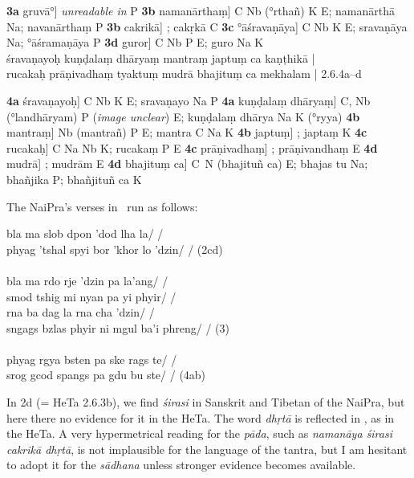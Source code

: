 \documentclass[naipra.tex]{subfiles}
\begin{document}
\begin{sanskrit}
{\begin{english}
\begin{prosequote}
			\noindent \textbf{3a} gruvā°] \emph{unreadable in} P
			\textbf{3b} namanārthaṃ] C Nb (°rthañ) K E; namanārthā Na; navanārthaṃ P
			\textbf{3b} cakrikā] ; cakṛkā C
			\textbf{3c} °āśravaṇāya] C Nb K E; sravaṇāya Na; °āśramaṇāya P
			\textbf{3d} guror] C Nb P E; guro Na K\\

			\noindent śravaṇayoḥ kuṇḍalaṃ dhāryaṃ mantraṃ japtuṃ ca kaṇṭhikā |\\
			rucakaḥ prāṇivadhaṃ tyaktuṃ mudrā bhajituṃ ca mekhalam | 2.6.4a–d
			\medskip

			\noindent \textbf{4a} śravaṇayoḥ] C Nb K E; sravaṇayo Na P
			\textbf{4a} kuṇḍalaṃ dhāryaṃ] C, Nb (°landhāryam) P (\emph{image unclear}) E; kuṇḍalaṃ dhārya Na K (°ryya)
			\textbf{4b} mantraṃ] Nb (mantrañ) P E; mantra C Na K
			\textbf{4b} japtuṃ] ; japtaṃ K
			\textbf{4c} rucakaḥ] C Na Nb K; rucakaṃ P E
			\textbf{4c} prāṇivadhaṃ] ; prāṇivandhaṃ E
			\textbf{4d} mudrā] ; mudrām E
			\textbf{4d} bhajituṃ ca] C\PCreading\ N (bhajituñ ca) E; bhajas tu Na; bhañjika P; bhañjituñ ca K
		\end{prosequote}

		The NaiPra's verses in \TIB\ run as follows:

		\begin{prosequote}%
			bla ma slob dpon 'dod lha la/ /\\
			phyag 'tshal spyi bor 'khor lo 'dzin/ / (2cd)\\
			\\
			bla ma rdo rje 'dzin pa la'ang/ /\\
			smod tshig mi nyan pa yi phyir/ /\\
			rna ba dag la rna cha 'dzin/ /\\
			sngags bzlas phyir ni mgul ba'i phreng/ / (3)\\
			\\
			phyag rgya bsten pa ske rags te/ /\\
			srog gcod spangs pa gdu bu ste/ / (4ab)
		\end{prosequote}

		In 2d (= HeTa 2.6.3b), we find \emph{śirasi} in Sanskrit and Tibetan of the NaiPra, but here there no evidence for it in the HeTa.
		The word \emph{dhṛtā} is reflected in \TIB , as in the HeTa.
		A very hypermetrical reading for the \emph{pāda}, such as \emph{namanāya śirasi cakrikā dhṛtā}, is not implausible for the language of the tantra, but I am hesitant to adopt it for the \emph{sādhana} unless stronger evidence becomes available.


\end{english}}
\end{sanskrit}
\end{document}
